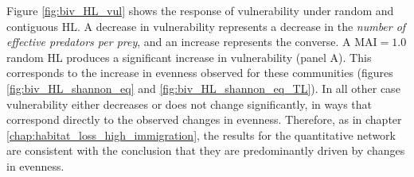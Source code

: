 Figure \ref{fig:biv_HL_vul} shows the response of vulnerability under random and contiguous HL. A decrease in vulnerability represents a decrease in the \emph{number of effective predators per prey}, and an increase represents the converse. A MAI$=1.0$ random HL produces a significant increase in vulnerability (panel A). This corresponds to the increase in evenness observed for these communities (figures \ref{fig:biv_HL_shannon_eq} and \ref{fig:biv_HL_shannon_eq_TL}). In all other case vulnerability either decreases or does not change significantly, in ways that correspond directly to the observed changes in evenness. Therefore, as in chapter \ref{chap:habitat_loss_high_immigration}, the results for the quantitative network are consistent with the conclusion that they are predominantly driven by changes in evenness. 
 
